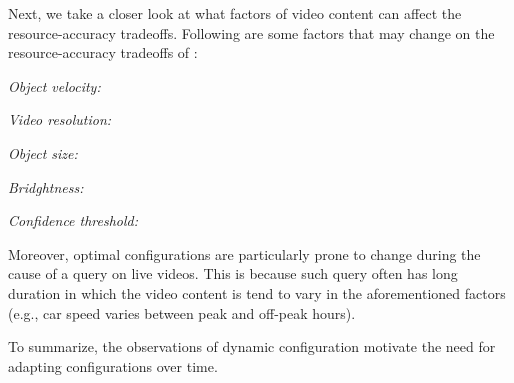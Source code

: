 Next, we take a closer look at what factors of video content can 
affect the resource-accuracy tradeoffs. 
Following are some factors that may change on the 
resource-accuracy tradeoffs of \nn:
\begin{packeditemize}
\item {\em Object velocity: }
\item {\em Video resolution: }
\item {\em Object size: }
\item {\em Bridghtness: }
\item {\em Confidence threshold: }
\end{packeditemize}


Moreover, optimal configurations are particularly prone to change 
during the cause of a query on live videos. 
This is because such query often
has long duration in which the video content is tend to vary in the 
aforementioned factors (e.g., car speed varies between peak and 
off-peak hours).

To summarize, the observations of dynamic configuration motivate the 
need for adapting configurations over time. 
